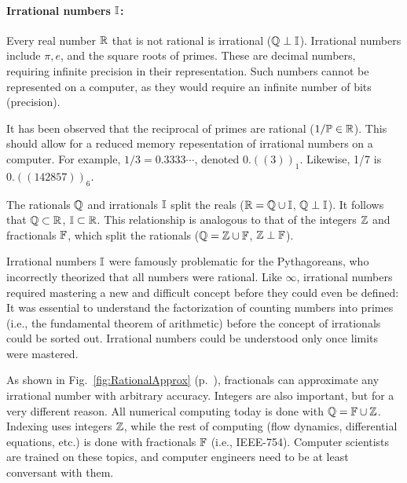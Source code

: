 \documentclass{ximera}
\begin{document}
\label{Allen24}
\paragraph{Irrational numbers $\mathbb{I}$: \label{page:bbI} }
Every real number $\mathbb{R}$ that is not rational is irrational ($\mathbb{Q} \perp \mathbb{I}$).
Irrational numbers include $\pi, e$, and the square roots of primes.
These are decimal numbers, requiring infinite precision in their representation. 
Such numbers cannot be represented on a computer, as they would require an infinite number of bits (precision).

It has been observed that the reciprocal of primes are rational ($1/\mathbb{P} \in\mathbb{R} $).
This should allow for a reduced memory repesentation of irrational numbers on a computer. 
For example, $1/3 = 0.3333\cdots$, denoted $0.((3))_1$.  Likewise, 1/7 is $0.((142857))_6$.

The rationals $\mathbb{Q}$ and irrationals $\mathbb{I}$ split the reals ($\mathbb{R} = \mathbb{Q}\cup\mathbb{I}$, $\mathbb{Q}\perp\mathbb{I}$).
It follows that $\mathbb{Q}\subset\mathbb{R}$, $\mathbb{I}\subset\mathbb{R}$. 
This relationship is analogous to that of the integers $\mathbb{Z}$ and fractionals $\mathbb{F}$, which split the rationals
($\mathbb{Q} = \mathbb{Z}\cup\mathbb{F}$, $\mathbb{Z}\perp\mathbb{F}$).

Irrational numbers $\mathbb{I}$ were famously problematic for the Pythagoreans, who incorrectly theorized that
all numbers were rational. 
Like $\infty$, irrational numbers required mastering a new and difficult concept before they could even
be defined:
It was essential to understand the factorization of counting numbers into primes (i.e., the fundamental
theorem of arithmetic) before the concept of irrationals could be sorted out. 
Irrational numbers could be understood only once limits were mastered.

As shown in Fig.~\ref{fig:RationalApprox} (p.~\pageref{fig:RationalApprox}), fractionals can
approximate any irrational number with arbitrary accuracy. 
Integers are also important, but for a very different reason.  All
numerical computing today is done with $\mathbb{Q} = \mathbb{F}\cup\mathbb{Z}$.  Indexing uses integers $\mathbb{Z}$, while the rest of
computing (flow dynamics, differential equations, etc.) is done with fractionals $\mathbb{F}$ (i.e., IEEE-754).
Computer scientists are trained on these topics, and computer engineers need to be at least conversant
with them.
\end{document}
